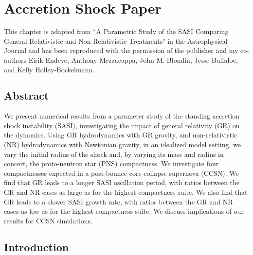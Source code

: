 \chapter{Accretion Shock Paper}

This chapter is adapted from
``A Parametric Study of the SASI Comparing General Relativistic
and Non-Relativistic Treatments" in the Astrophysical Journal and has been
reproduced with the permission of the publisher and my co-authors
Eirik Endeve, Anthony Mezzacappa, John M. Blondin, Jesse Buffaloe, and Kelly
Holley-Bockelmann.

\section{Abstract}
We present numerical results from a parameter study of the standing accretion
shock instability (SASI), investigating the impact of general relativity (GR)
on the dynamics. Using GR hydrodynamics with GR gravity,
and non-relativistic (NR) hydrodynamics with Newtonian gravity,
in an idealized model setting, we vary the initial radius of the shock and,
by varying its mass and radius in concert, the proto-neutron star (PNS)
compactness.
We investigate four compactnesses expected in a post-bounce
core-collapse supernova (CCSN).
We find that GR leads to a longer SASI oscillation period,
with ratios between the GR and NR cases as large as \PeriodRatioGRoverNRxiD{}
for the highest-compactness suite.
We also find that GR leads to a slower SASI growth rate,
with ratios between the GR and NR cases as low as \GrowthRateRatioGRoverNRxiD{}
for the highest-compactness suite. We discuss implications of our results for
CCSN simulations.

\section{Introduction}


